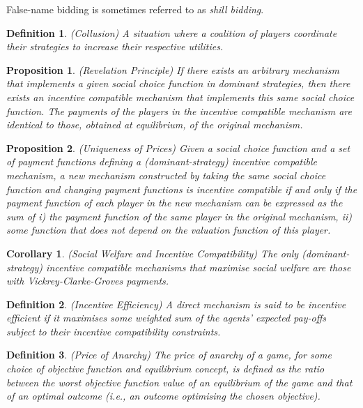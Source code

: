 \documentclass{article}
\newtheorem{proposition}{Proposition}
\newtheorem{definition}{Definition}
\newtheorem{corollary}{Corollary}
\begin{document}
False-name bidding is sometimes referred to as \textit{shill bidding}.

\begin{definition}
(Collusion) A situation where a coalition of players coordinate their strategies to increase their respective utilities.
\end{definition}

\begin{proposition}
(Revelation Principle) If there exists an arbitrary mechanism that implements a given social choice function in dominant strategies, then there exists an incentive compatible mechanism that implements this same social choice function. The payments of the players in the incentive compatible mechanism are identical to those, obtained at equilibrium, of the original mechanism.
\end{proposition}

\begin{proposition}
(Uniqueness of Prices) Given a social choice function and a set of payment functions defining a (dominant-strategy) incentive compatible mechanism, a new mechanism constructed by taking the same social choice function and changing payment functions is incentive compatible if and only if the payment function of each player in the new mechanism can be expressed as the sum of i) the payment function of the same player in the original mechanism, ii) some function that does not depend on the valuation function of this player.
\end{proposition}

\begin{corollary}
(Social Welfare and Incentive Compatibility) The only (dominant-strategy) incentive compatible mechanisms that maximise social welfare are those with Vickrey-Clarke-Groves payments.
\end{corollary}

\begin{definition}
(Incentive Efficiency) A direct mechanism is said to be incentive efficient if it maximises some weighted sum of the agents' expected pay-offs subject to their incentive compatibility constraints.
\end{definition}

\begin{definition}
(Price of Anarchy) The price of anarchy of a game, for some choice of objective function and equilibrium concept, is defined as the ratio between the worst objective function value of an equilibrium of the game and that of an optimal outcome (i.e., an outcome optimising the chosen objective).
\end{definition}
\end{document}
